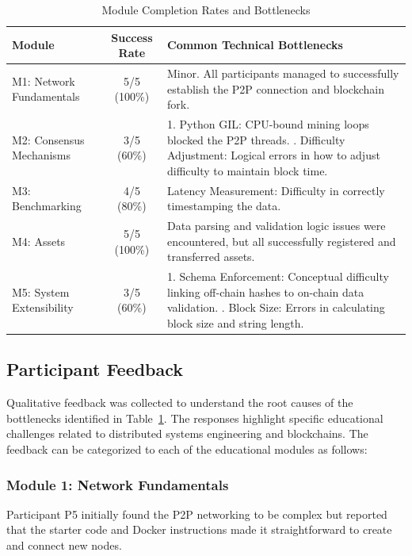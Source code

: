 \begin{table}[H]
    \centering
    \begin{tabular}{|l|c|p{6cm}|}
    \hline
    \textbf{Module} & \textbf{Success Rate} & \textbf{Common Technical Bottlenecks} \\ \hline
    M1: Network Fundamentals & 5/5 (100\%) & Minor. All participants managed to successfully establish the P2P connection and blockchain fork. \\ \hline
    M2: Consensus Mechanisms & 3/5 (60\%) & 1. Python GIL: CPU-bound mining loops blocked the P2P threads. \newline 2. Difficulty Adjustment: Logical errors in how to adjust difficulty to maintain block time. \\ \hline
    M3: Benchmarking & 4/5 (80\%) & Latency Measurement: Difficulty in correctly timestamping the data. \\ \hline
    M4: Assets & 5/5 (100\%) & Data parsing and validation logic issues were encountered, but all successfully registered and transferred assets. \\ \hline
    M5: System Extensibility & 3/5 (60\%) & 1. Schema Enforcement: Conceptual difficulty linking off-chain hashes to on-chain data validation. \newline 2. Block Size: Errors in calculating block size and string length. \\ \hline
    \end{tabular}
    \caption{Module Completion Rates and Bottlenecks}
    \label{tab:completion_rates}
\end{table}

\subsection{Participant Feedback}
Qualitative feedback was collected to understand the root causes of the bottlenecks identified in Table~\ref{tab:completion_rates}. The responses highlight specific educational challenges related to distributed systems engineering and blockchains. The feedback can be categorized to each of the educational modules as follows:

\subsubsection{Module 1: Network Fundamentals}
Participant P5 initially found the P2P networking to be complex but reported that the starter code and Docker instructions made it straightforward to create and connect new nodes.

